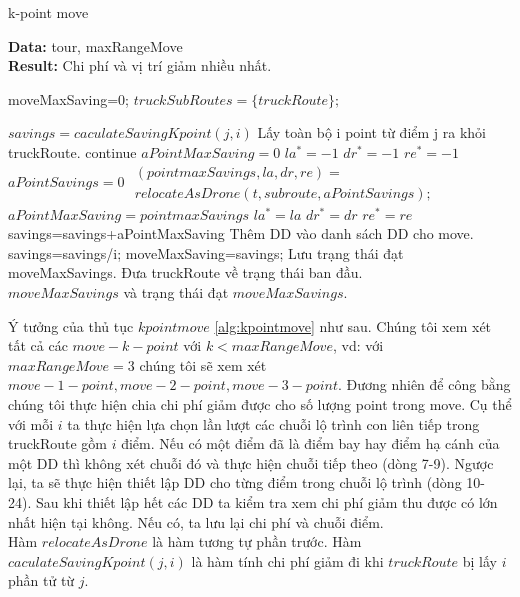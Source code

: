 \documentclass[a4paper,12pt]{report}
\begin{document}
\begin{algorithm}[H]

\caption{k-point move}
\textbf{Data:} tour, maxRangeMove\\
\textbf{Result:} Chi phí và vị trí giảm nhiều nhất.

\begin{algorithmic}[1]
\State moveMaxSaving=0;
\State $truckSubRoutes = \{truckRoute\};$

\State $savings=caculateSavingKpoint(j,i)$
\State Lấy toàn bộ i point từ điểm j ra khỏi truckRoute.
\State continue
\EndIf
{}
\State $aPointMaxSaving=0$
\State $la^*=-1$
\State $dr^*=-1$
\State $re^*=-1$
\State $aPointSavings=0$
\State $\begin{array}{l}

(pointmaxSavings,la,dr,re)= \\ relocateAsDrone(t,subroute,aPointSavings);\end{array}$
\State $aPointMaxSaving=pointmaxSavings$
\State $la^*=la$
\State $dr^*=dr$
\State $re^*=re$
\EndIf
\EndFor	
\State savings=savings+aPointMaxSaving
\State Thêm \ac{DD} vào danh sách \ac{DD} cho move.
\EndFor
\State savings=savings/i;
\State moveMaxSaving=savings;
\State Lưu trạng thái đạt moveMaxSavings.
\EndIf
\State Đưa truckRoute về trạng thái ban đầu.
\EndFor
\EndFor\\
\Return $moveMaxSavings$ và trạng thái đạt $moveMaxSavings$.
\end{algorithmic}
\label{alg:kpointmove}
\end{algorithm}
Ý tưởng của thủ tục $kpointmove$ \ref{alg:kpointmove} như sau. Chúng tôi xem xét tất cả các $move-k-point$ với $k<maxRangeMove$, vd: với $maxRangeMove=3$ chúng tôi sẽ xem xét $move-1-point,move-2-point,move-3-point$. Đương nhiên để công bằng chúng tôi thực hiện chia chi phí giảm được cho số lượng point trong move. Cụ thể với mỗi $i$ ta thực hiện lựa chọn lần lượt các chuỗi lộ trình con liên tiếp trong truckRoute gồm $i$ điểm. Nếu có một điểm đã là điểm bay hay điểm hạ cánh của một \ac{DD} thì không xét chuỗi đó và thực hiện chuỗi tiếp theo (dòng 7-9). Ngược lại, ta sẽ thực hiện thiết lập \ac{DD} cho từng điểm trong chuỗi lộ trình (dòng 10- 24). Sau khi thiết lập hết các \ac{DD} ta kiểm tra xem chi phí giảm thu được có lớn nhất hiện tại không. Nếu có, ta lưu lại chi phí và chuỗi điểm. \\
 Hàm $relocateAsDrone$ là hàm tương tự phần trước. Hàm $caculateSavingKpoint(j,i)$ là hàm tính chi phí giảm đi khi $truckRoute$ bị lấy $i$ phần tử từ $j$.
\end{document}
